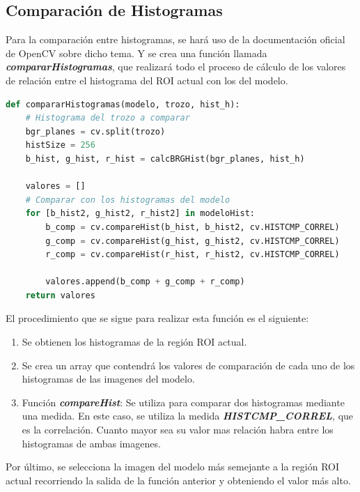 \documentclass[a4paper]{article} %
\renewcommand{\baselinestretch}{1.5}
\begin{document}
\subsection{Comparación de Histogramas}
Para la comparación entre histogramas, se hará uso de la documentación oficial de OpenCV sobre dicho tema. \cite{histComp} Y se crea una función llamada \textbf{\textit{compararHistogramas}}, que realizará todo el proceso de cálculo de los valores de relación entre el histograma del ROI actual con los del modelo.

\renewcommand{\baselinestretch}{1}
\begin{tcolorbox}[]
\begin{lstlisting}[language=Python]
def compararHistogramas(modelo, trozo, hist_h):
    # Histograma del trozo a comparar
    bgr_planes = cv.split(trozo)
    histSize = 256
    b_hist, g_hist, r_hist = calcBRGHist(bgr_planes, hist_h)

    valores = []
    # Comparar con los histogramas del modelo
    for [b_hist2, g_hist2, r_hist2] in modeloHist:
        b_comp = cv.compareHist(b_hist, b_hist2, cv.HISTCMP_CORREL)
        g_comp = cv.compareHist(g_hist, g_hist2, cv.HISTCMP_CORREL)
        r_comp = cv.compareHist(r_hist, r_hist2, cv.HISTCMP_CORREL)
                                
        valores.append(b_comp + g_comp + r_comp)
    return valores
\end{lstlisting}
\end{tcolorbox}
\renewcommand{\baselinestretch}{1.5}

El procedimiento que se sigue para realizar esta función es el siguiente:

\begin{enumerate}
    \item Se obtienen los histogramas de la región ROI actual.
    \item Se crea un array que contendrá los valores de comparación de cada uno de los histogramas de las imagenes del modelo.
    \item Función \textbf{\textit{compareHist}}: Se utiliza para comparar dos histogramas mediante una medida. En este caso, se utiliza la medida \textbf{\textit{HISTCMP\_CORREL}}, que es la correlación. Cuanto mayor sea su valor mas relación habra entre los histogramas de ambas imagenes.
\end{enumerate}

Por último, se selecciona la imagen del modelo más semejante a la región ROI actual recorriendo la salida de la función anterior y obteniendo el valor más alto.
\end{document}
